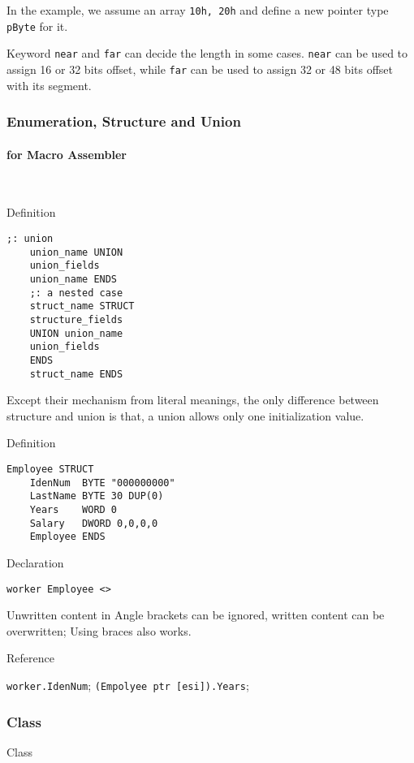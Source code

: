 In the example, we assume an array \verb|10h, 20h| and define a new pointer type \verb|pByte| for it. 

Keyword \verb`near` and \verb`far` can decide the length in some cases.
\verb`near` can be used to assign 16 or 32 bits offset,
while \verb`far` can be used to assign 32 or 48 bits offset with its segment.


\subsubsection{Enumeration, Structure and Union}

\paragraph{for Macro Assembler} \

{Definition}
\begin{lstlisting}[language={[x86masm]Assembler}]
	;: union
	union_name UNION
	union_fields
	union_name ENDS
	;: a nested case
	struct_name STRUCT
	structure_fields
	UNION union_name
	union_fields
	ENDS
	struct_name ENDS
\end{lstlisting}

Except their mechanism from literal meanings, the only difference between structure and union is that, a union allows only one initialization value.


{Definition}
\begin{lstlisting}[language={[x86masm]Assembler}]
	Employee STRUCT
	IdenNum  BYTE "000000000"
	LastName BYTE 30 DUP(0)
	Years    WORD 0
	Salary   DWORD 0,0,0,0
	Employee ENDS
\end{lstlisting}

{Declaration}
\begin{lstlisting}[language={[x86masm]Assembler}]
	worker Employee <>
\end{lstlisting}

Unwritten content in Angle brackets can be ignored, written content can be overwritten; Using braces also works.

{Reference}

\verb|worker.IdenNum|; \verb|(Empolyee ptr [esi]).Years|;

\subsubsection{Class}
{Class}






